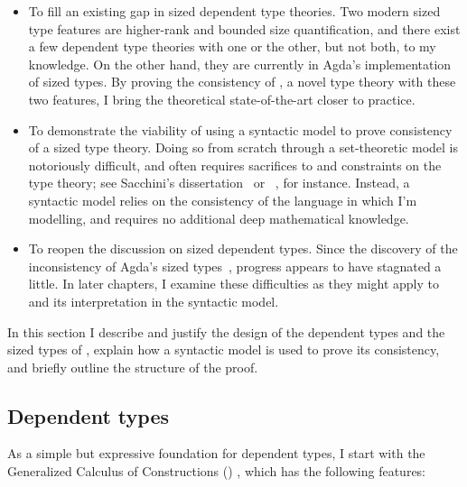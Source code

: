 \begin{itemize}
  \item To fill an existing gap in sized dependent type theories.
    Two modern sized type features are higher-rank and bounded size quantification,
    and there exist a few dependent type theories with one or the other,
    but not both, to my knowledge.
    On the other hand, they are currently in Agda's implementation of sized types.
    By proving the consistency of \lang, a novel type theory with these two features,
    I bring the theoretical state-of-the-art closer to practice.
  \item To demonstrate the viability of using a syntactic model to prove consistency
    of a sized type theory.
    Doing so from scratch through a set-theoretic model is notoriously difficult,
    and often requires sacrifices to and constraints on the type theory;
    see Sacchini's dissertation~\citep{CIC-hat-minus} or \CIChatstar~\citep{CIC-hat-star},
    for instance.
    Instead, a syntactic model relies on the consistency of the language in which I'm modelling,
    and requires no additional deep mathematical knowledge.
  \item To reopen the discussion on sized dependent types.
    Since the discovery of the inconsistency of Agda's sized types~\citep{infinity},
    progress appears to have stagnated a little.
    In later chapters, I examine these difficulties as they might apply to \lang
    and its interpretation in the syntactic model.
\end{itemize}

In this section I describe and justify the design of
the dependent types and the sized types of \lang,
explain how a syntactic model is used to prove its consistency,
and briefly outline the structure of the proof.

\subsection{Dependent types}

As a simple but expressive foundation for dependent types,
I start with the Generalized Calculus of Constructions (\GCC) \citep{GCC-Coquand},
which has the following features:

